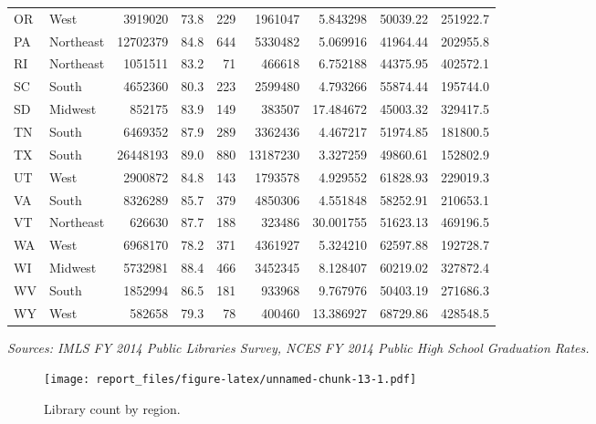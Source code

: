 \documentclass[12pt,]{article}
\begin{document}
\begin{table}[!h]
{\begin{tabular}[t]{llrrrrrrr}
OR & West & 3919020 & 73.8 & 229 & 1961047 & 5.843298 & 50039.22 & 251922.7\\
PA & Northeast & 12702379 & 84.8 & 644 & 5330482 & 5.069916 & 41964.44 & 202955.8\\
RI & Northeast & 1051511 & 83.2 & 71 & 466618 & 6.752188 & 44375.95 & 402572.1\\
SC & South & 4652360 & 80.3 & 223 & 2599480 & 4.793266 & 55874.44 & 195744.0\\
\addlinespace
SD & Midwest & 852175 & 83.9 & 149 & 383507 & 17.484672 & 45003.32 & 329417.5\\
TN & South & 6469352 & 87.9 & 289 & 3362436 & 4.467217 & 51974.85 & 181800.5\\
TX & South & 26448193 & 89.0 & 880 & 13187230 & 3.327259 & 49860.61 & 152802.9\\
UT & West & 2900872 & 84.8 & 143 & 1793578 & 4.929552 & 61828.93 & 229019.3\\
VA & South & 8326289 & 85.7 & 379 & 4850306 & 4.551848 & 58252.91 & 210653.1\\
\addlinespace
VT & Northeast & 626630 & 87.7 & 188 & 323486 & 30.001755 & 51623.13 & 469196.5\\
WA & West & 6968170 & 78.2 & 371 & 4361927 & 5.324210 & 62597.88 & 192728.7\\
WI & Midwest & 5732981 & 88.4 & 466 & 3452345 & 8.128407 & 60219.02 & 327872.4\\
WV & South & 1852994 & 86.5 & 181 & 933968 & 9.767976 & 50403.19 & 271686.3\\
WY & West & 582658 & 79.3 & 78 & 400460 & 13.386927 & 68729.86 & 428548.5\\
\bottomrule
\end{tabular}}
\end{table}

\noindent
\textit{Sources: IMLS FY 2014 Public Libraries Survey, NCES FY 2014 Public High School Graduation Rates.}

\newpage

\vspace{20pt}

\begin{figure}[htbp]
\centering
\texttt{[image: report\_files/figure-latex/unnamed-chunk-13-1.pdf]}
\caption{Library count by region.}
\end{figure}

\vspace{0pt}

\vspace{20pt}
\end{document}
